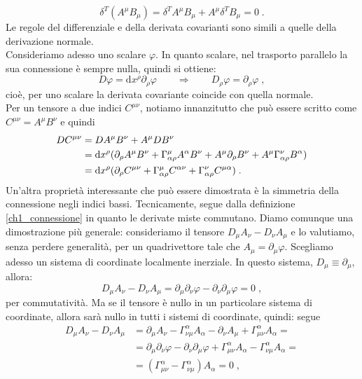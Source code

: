 \documentclass[12pt,a4paper]{report}
\theoremstyle{definition}
\newcommand{\diff}[1][]{\mathrm{d}#1}
\begin{document}
$$
\delta^T(A^{\mu}B_{\mu})=\delta^TA^{\mu}B_{\mu}+A^{\mu}\delta^TB_{\mu}=0\;.
$$
Le regole del differenziale e della derivata covarianti sono simili a quelle della derivazione normale. \\
Consideriamo adesso uno scalare $\varphi$. In quanto scalare, nel trasporto parallelo la sua connessione è sempre nulla, quindi si ottiene:
\begin{equation}
D\varphi=\diff{x^{\rho}}\partial_{\rho}\varphi\qquad\Longrightarrow\qquad D_{\rho}\varphi=\partial_{\rho}\varphi\;,
\end{equation}
cioè, per uno scalare la derivata covariante coincide con quella normale. \\
Per un tensore a due indici $C^{\mu\nu}$, notiamo innanzitutto che può essere scritto come $C^{\mu\nu}=A^{\mu}B^{\nu}$ e quindi
\begin{align}
DC^{\mu\nu} &= DA^{\mu}B^{\nu}+A^{\mu}DB^{\nu} \notag \\
&= \diff{x^{\rho}}(\partial_{\rho}A^{\mu}B^{\nu}+\Gamma^{\mu}_{\alpha\rho}A^{\alpha}B^{\nu}+A^{\mu}\partial_{\rho}B^{\nu}+A^{\mu}\Gamma^{\nu}_
{\alpha\rho}B^{\alpha}) \notag \\
&= \diff{x^{\rho}}(\partial_{\rho}C^{\mu\nu}+\Gamma^{\mu}_{\alpha\rho}C^{\alpha\nu}+\Gamma^{\nu}_{\alpha\rho}C^{\mu\alpha})\;.
\end{align}
Un'altra proprietà interessante che può essere dimostrata è la simmetria della connessione negli indici bassi. Tecnicamente, segue dalla definizione \eqref{ch1_connessione} in quanto le derivate miste commutano. Diamo comunque una dimostrazione più generale: consideriamo il tensore $D_{\mu}A_{\nu}-D_{\nu}A_{\mu}$ e lo valutiamo, senza perdere generalità, per un quadrivettore tale che $A_{\mu}=\partial_{\mu}\varphi$. Scegliamo adesso un sistema di coordinate localmente inerziale. In questo sistema, $D_{\mu}\equiv\partial_{\mu}$, allora:
$$
D_{\mu}A_{\nu}-D_{\nu}A_{\mu}=\partial_{\mu}\partial_{\nu}\varphi-\partial_{\nu}\partial_{\mu}\varphi=0\;,
$$
per commutatività. Ma se il tensore è nullo in un particolare sistema di coordinate, allora sarà nullo in tutti i sistemi di coordinate, quindi: segue
\begin{align*}
D_{\mu}A_{\nu}-D_{\nu}A_{\mu} &= \partial_{\mu}A_{\nu}-\Gamma^{\alpha}_{\nu\mu}A_{\alpha}-\partial_{\nu}A_{\mu}+\Gamma^{\alpha}_{\mu\nu}A_{\alpha}= \\
&= \partial_{\mu}\partial_{\nu}\varphi-\partial_{\nu}\partial_{\mu}\varphi+\Gamma^{\alpha}_{\mu\nu}A_{\alpha}-\Gamma^{\alpha}_{
\nu\mu}A_{\alpha}= \\
&= (\Gamma^{\alpha}_{\mu\nu}-\Gamma^{\alpha}_{\nu\mu})A_{\alpha}=0\;,
\end{align*}
\end{document}
